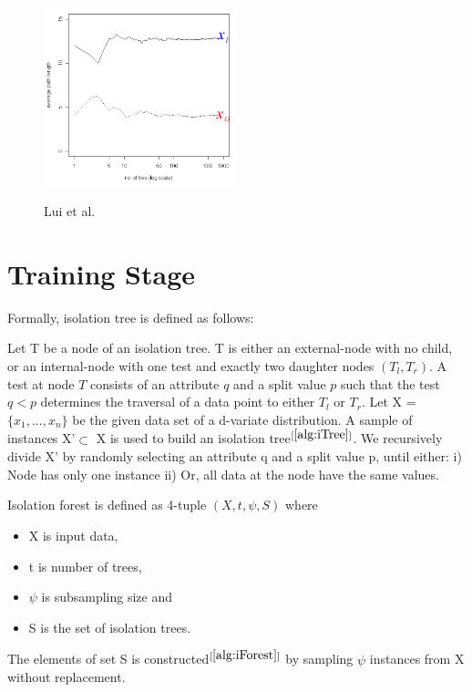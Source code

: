 \vspace{1em}
\begin{figure}[!ht]
    \centering
    \includegraphics[width=0.50\textwidth]{../fig/chapter2/path-length-for-that-point.png}
    
    {Lui et al. \cite{10.1145/2133360.2133363}}
    \label{fig:path-length}
\end{figure}

\section{Training Stage}
\label{sec:iforest-training}

Formally, isolation tree is defined as follows:

\begin{defn}
    Let T be a node of an isolation tree.
    T is either an external-node with no child, or an internal-node with one test and exactly two daughter nodes $(T_l, T_r)$.
    A test at node $T$ consists of an attribute $q$ and a split value $p$ such that the test $q < p$ determines the traversal of a data point to either $T_l$ or $T_r$.
    Let X = $\{x_1, ..., x_n\}$ be the given data set of a d-variate distribution.
    A sample of instances X'$\subset$ X is used to build an isolation tree$^{[\ref{alg:iTree}]}$.
    We recursively divide X' by randomly selecting an attribute q and a split value p, until either: i) Node has only one instance ii) Or, all data at the node have the same values.
\end{defn}


\begin{defn}
    Isolation forest is defined as 4-tuple $(X, t, \psi, S)$ where
    \vspace{-1em}
    \begin{itemize}
        \setlength\itemsep{-1em}
        \item X is input data,
        \item t is number of trees,
        \item $\psi$ is subsampling size and
        \item S is the set of isolation trees.
    \end{itemize}
    \vspace{-1em}
    The elements of set S is constructed$^{[\ref{alg:iForest}]}$ by sampling $\psi$ instances from X without replacement.
\end{defn}

